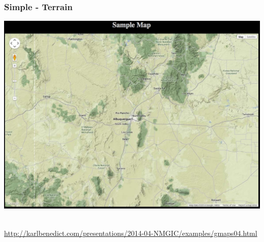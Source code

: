 \documentclass[]{article}
\begin{document}
\subsubsection{Simple - Terrain}\label{simple---terrain}

\includegraphics{images/google_04.jpg}~

\url{http://karlbenedict.com/presentations/2014-04-NMGIC/examples/gmaps04.html}
\end{document}
